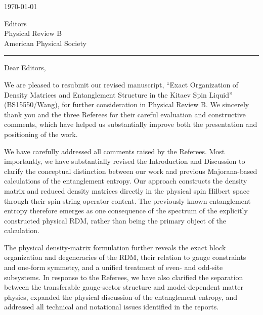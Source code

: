 \documentclass[12pt]{article}
\begin{document}
\fontsize{12pt}{14pt}\selectfont

\begin{flushright}
    \today
\end{flushright}
\begin{flushleft}
Editors
\\
Physical Review B
\\
American Physical Society
\end{flushleft}
\vspace{-5mm}

\noindent\rule{\linewidth}{1.2pt}

\vspace{5mm}
\fontsize{12pt}{18pt}\selectfont
\noindent Dear Editors,

\bigskip

We are pleased to resubmit our revised manuscript, “Exact Organization of Density Matrices and Entanglement Structure in the Kitaev Spin Liquid” (BS15550/Wang), for further consideration in Physical Review B. We sincerely thank you and the three Referees for their careful evaluation and constructive comments, which have helped us substantially improve both the presentation and positioning of the work.

We have carefully addressed all comments raised by the Referees. Most importantly, we have substantially revised the Introduction and Discussion to clarify the conceptual distinction between our work and previous Majorana-based calculations of the entanglement entropy. Our approach constructs the density matrix and reduced density matrices directly in the physical spin Hilbert space through their spin-string operator content. The previously known entanglement entropy therefore emerges as one consequence of the spectrum of the explicitly constructed physical RDM, rather than being the primary object of the calculation.

The physical density-matrix formulation further reveals the exact block organization and degeneracies of the RDM, their relation to gauge constraints and one-form symmetry, and a unified treatment of even- and odd-site subsystems. In response to the Referees, we have also clarified the separation between the transferable gauge-sector structure and model-dependent matter physics, expanded the physical discussion of the entanglement entropy, and addressed all technical and notational issues identified in the reports.
\end{document}
